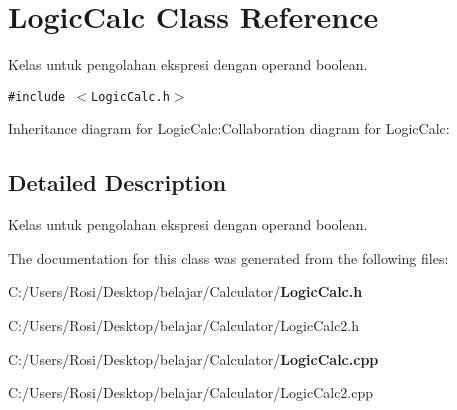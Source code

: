 \section{Logic\-Calc Class Reference}
\label{class_logic_calc}
Kelas untuk pengolahan ekspresi dengan operand boolean.  


{\tt \#include $<$Logic\-Calc.h$>$}

Inheritance diagram for Logic\-Calc:Collaboration diagram for Logic\-Calc:

\subsection{Detailed Description}
Kelas untuk pengolahan ekspresi dengan operand boolean. 



The documentation for this class was generated from the following files:\begin{CompactItemize}
\item 
C:/Users/Rosi/Desktop/belajar/Calculator/{\bf Logic\-Calc.h}\item 
C:/Users/Rosi/Desktop/belajar/Calculator/Logic\-Calc2.h\item 
C:/Users/Rosi/Desktop/belajar/Calculator/{\bf Logic\-Calc.cpp}\item 
C:/Users/Rosi/Desktop/belajar/Calculator/Logic\-Calc2.cpp\end{CompactItemize}
